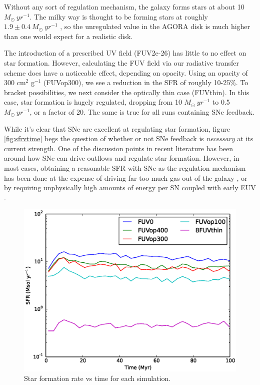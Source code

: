Without any sort of regulation mechanism, the galaxy forms stars at about 10 $M_{\odot}~yr^{-1}$. The milky way is thought to be forming stars at roughly $1.9 \pm 0.4~M_{\odot}~yr^{-1}$ \citep{chomiukPovich11}, so the unregulated value in the AGORA disk is much higher than one would expect for a realistic disk. 

The introduction of a prescribed UV field (FUV2e-26) has little to no effect on star formation. However, calculating the FUV field via our radiative transfer scheme does have a noticeable effect, depending on opacity. Using an opacity of 300 cm$^2$ g$^{-1}$ (FUVop300), we see a reduction in the SFR of roughly 10-25\%. To bracket possibilities, we next consider the optically thin case (FUVthin). In this case, star formation is hugely regulated, dropping from 10 $M_{\odot}~yr^{-1}$ to 0.5 $M_{\odot}~yr^{-1}$, or a factor of 20. The same is true for all runs containing SNe feedback.

While it's clear that SNe are excellent at regulating star formation, figure \ref{fig:sfrvtime} begs the question of whether or not SNe feedback is \emph{necessary} at its current strength. One of the discussion points in recent literature has been around how SNe can drive outflows and regulate star formation. However, in most cases, obtaining a reasonable SFR with SNe as the regulation mechanism has been done at the expense of driving far too much gas out of the galaxy \citep{scannapiecoEt12}, or by requiring unphysically high amounts of energy per SN coupled with early EUV \citep{stinsonEt13}. 

\begin{figure}
\includegraphics[width=\textwidth]{graphics/sfrvtimeRT.eps}
\caption[Star formation histories.]{Star formation rate vs time for each simulation.}
\label{fig:sfrvtimeRT}
\end{figure}


